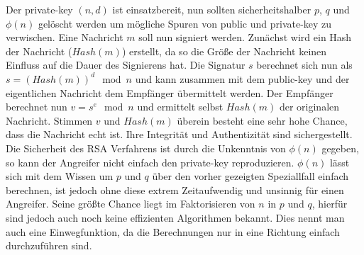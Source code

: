 \documentclass[thesis=bachelor,faculty=cb]{hsmw-thesis}
\begin{document}
Der private-key $(n, d)$ ist einsatzbereit, nun sollten sicherheitshalber $p$, $q$ und $\phi(n)$ gelöscht werden um mögliche Spuren von public und private-key zu verwischen. Eine Nachricht $m$ soll nun signiert werden. Zunächst wird ein Hash der Nachricht ($Hash(m)$) erstellt, da so die Größe der Nachricht keinen
Einfluss auf die Dauer des Signierens hat. Die Signatur $s$ berechnet sich nun als $s = (Hash(m))^{d} \mod n$ und kann zusammen mit dem public-key und der eigentlichen Nachricht dem Empfänger übermittelt werden. Der Empfänger berechnet nun $v = s^{e} \mod n$ und ermittelt selbst $Hash(m)$ der
originalen Nachricht. Stimmen $v$ und $Hash(m)$ überein besteht eine sehr hohe Chance, dass die Nachricht echt ist. Ihre Integrität und Authentizität sind sichergestellt. Die Sicherheit des RSA Verfahrens ist durch die Unkenntnis von $\phi(n)$ gegeben, so kann der Angreifer nicht einfach
den private-key reproduzieren. $\phi(n)$ lässt sich mit dem Wissen um  $p$ und $q$ über den vorher gezeigten Speziallfall einfach berechnen, ist jedoch ohne diese extrem Zeitaufwendig und unsinnig für einen Angreifer. Seine größte Chance liegt im Faktorisieren von $n$ in $p$ und $q$, hierfür sind jedoch auch
noch keine effizienten Algorithmen bekannt. Dies nennt man auch eine Einwegfunktion, da die Berechnungen nur in eine Richtung einfach durchzuführen sind. 
\end{document}

